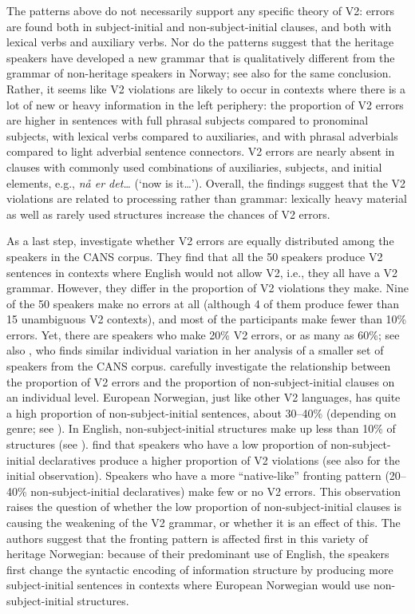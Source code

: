 \documentclass[output=paper]{langscibook}
\begin{document}
The patterns above do not necessarily support any specific theory of V2: errors are found both in subject\hyp initial and non\hyp subject\hyp initial clauses, and both with lexical verbs and auxiliary verbs. Nor do the patterns suggest that the heritage speakers have developed a new grammar that is qualitatively different from the grammar of non-heritage speakers in Norway; see also \citet{LarssonJohannessen2015Incomplete} for the same conclusion. Rather, it seems like V2 violations are likely to occur in contexts where there is a lot of new or heavy information in the left periphery: the proportion of V2 errors are higher in sentences with full phrasal subjects compared to pronominal subjects, with lexical verbs compared to auxiliaries, and with phrasal adverbials compared to light adverbial sentence connectors. V2 errors are nearly absent in clauses with commonly used combinations of auxiliaries, subjects, and initial elements, e.g., \textit{nå er det…} (‘now is it…’). Overall, the findings suggest that the V2 violations are related to processing rather than grammar: lexically heavy material as well as rarely used structures increase the chances of V2 errors.

As a last step, \citet{WestergaardEtAl2021} investigate whether V2 errors are equally distributed among the speakers in the CANS corpus. They find that all the 50 speakers produce V2 sentences in contexts where English would not allow V2, i.e., they all have a V2 grammar. However, they differ in the proportion of V2 violations they make. Nine of the 50 speakers make no errors at all (although 4 of them produce fewer than 15 unambiguous V2 contexts), and most of the participants make fewer than 10\% errors. Yet, there are speakers who make 20\% V2 errors, or as many as 60\%; see also \citet{Khayitova2016}, who finds similar individual variation in her analysis of a smaller set of speakers from the CANS corpus. \citet{WestergaardEtAl2021} carefully investigate the relationship between the proportion of V2 errors and the proportion of non\hyp subject\hyp initial clauses on an individual level. European Norwegian, just like other V2 languages, has quite a high proportion of non\hyp subject\hyp initial sentences, about 30--40\% (depending on genre; see \citealt{Olsen2019}). In English, non\hyp subject\hyp initial structures make up less than 10\% of structures (see \citealt{Yang2001}). \citet{WestergaardEtAl2021} find that speakers who have a low proportion of non\hyp subject\hyp initial declaratives produce a higher proportion of V2 violations (see also \citealt{WestergaardLohndal2019} for the initial observation). Speakers who have a more “native-like” fronting pattern (20--40\% non\hyp subject\hyp initial declaratives) make few or no V2 errors. This observation raises the question of whether the low proportion of non\hyp subject\hyp initial clauses is causing the weakening of the V2 grammar, or whether it is an effect of this. The authors suggest that the fronting pattern is affected first in this variety of heritage Norwegian: because of their predominant use of English, the speakers first change the syntactic encoding of information structure by producing more subject\hyp initial sentences in contexts where European Norwegian would use non\hyp subject\hyp initial structures. 
\end{document}
